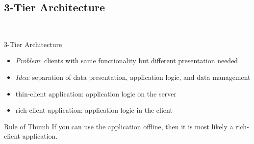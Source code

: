 \subsection{3-Tier Architecture}
\begin{frame}{\insertsubsection\ \normalsize{}}
	\begin{fancycolumns}[animation=none]
		\begin{definition}{3-Tier Architecture}
			\begin{itemize}
				\item \emph{Problem}: clients with same functionality but different presentation needed
				\item \emph{Idea}: separation of data presentation, application logic, and data management
				\item thin-client application: application logic on the server
				\item rich-client application: application logic in the client
			\end{itemize}
		\end{definition}%
		\begin{example}{Rule of Thumb}
			If you can use the application offline, then it is most likely a rich-client application.
		\end{example}
		\nextcolumn
	\end{fancycolumns}
\end{frame}

